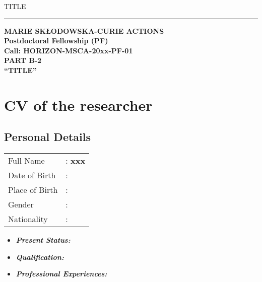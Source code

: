 \documentclass[a4paper,11pt,Times New Roman]{article}
\begin{document}
\begin{titlepage}

\vspace{5cm}
\begin{center}
TITLE
\vspace{0.3cm}
\hrule
\vspace{2cm}
{\Large \textbf{MARIE SK\L{}ODOWSKA-CURIE ACTIONS}}\\
\vspace{2cm}
\textbf{Postdoctoral Fellowship (PF)}\\
\vspace{0.5cm}
\textbf{Call: HORIZON-MSCA-20xx-PF-01}\\
\vspace{4cm}
{\Large \textbf{PART B-2}}\\
\vspace{3cm}
{\large \textbf{``TITLE''}}
\end{center}
\end{titlepage}
\tableofcontents

\newpage
	
\section{CV of the researcher }
\subsection{Personal Details}
\begin{tabular}{@{}p{1.5in}p{6in}}
\hspace{1cm}		Full Name     &: \textbf{xxx}\\
\hspace{1cm}		Date of Birth &: \\
\hspace{1cm}		Place of Birth &: \\
\hspace{1cm}		Gender        &: \\
\hspace{1cm}		Nationality   &: 
\end{tabular}
\begin{itemize}
\item \textbf{ \textit{Present Status:}} 
\item \textbf{ \textit{Qualification:}} 
\item \textbf{ \textit{Professional Experiences:}} 
\end{itemize}
\end{document}
